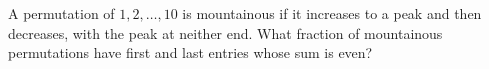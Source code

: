 A permutation of $1,2,\ldots,10$ is mountainous if it increases to a peak and then decreases, with the peak at neither end. What fraction of mountainous permutations have first and last entries whose sum is even?

